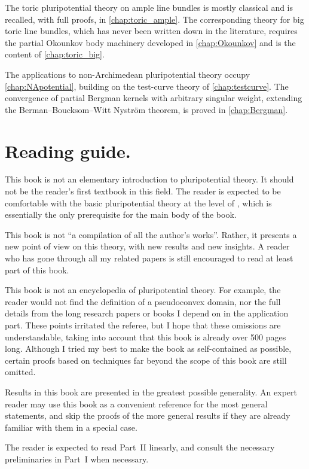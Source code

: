 The toric pluripotential theory on ample line bundles is mostly classical and is recalled, with full proofs, in \cref{chap:toric_ample}. The corresponding theory for big toric line bundles, which has never been written down in the literature, requires the partial Okounkov body machinery developed in \cref{chap:Okounkov} and is the content of \cref{chap:toric_big}.

The applications to non-Archimedean pluripotential theory occupy \cref{chap:NApotential}, building on the test-curve theory of \cref{chap:testcurve}. The convergence of partial Bergman kernels with arbitrary singular weight, extending the Berman--Boucksom--Witt Nyström theorem, is proved in \cref{chap:Bergman}.

\section*{Reading guide.}

This book is not an elementary introduction to pluripotential theory. It should not be the reader's first textbook in this field. The reader is expected to be comfortable with the basic pluripotential theory at the level of \cite{GZ17}, which is essentially the only prerequisite for the main body of the book.

This book is not ``a compilation of all the author's works''. Rather, it presents a new point of view on this theory, with new results and new insights. A reader who has gone through all my related papers is still encouraged to read at least part of this book.

This book is not an encyclopedia of pluripotential theory. For example, the reader would not find the definition of a pseudoconvex domain, nor the full details from the long research papers or books I depend on in the application part. These points irritated the referee, but I hope that these omissions are understandable, taking into account that this book is already over 500 pages long. Although I tried my best to make the book as self-contained as possible, certain proofs based on techniques far beyond the scope of this book are still omitted.

Results in this book are presented in the greatest possible generality. An expert reader may use this book as a convenient reference for the most general statements, and skip the proofs of the more general results if they are already familiar with them in a special case.

The reader is expected to read Part~II linearly, and consult the necessary preliminaries in Part~I when necessary.

